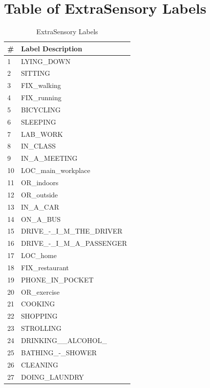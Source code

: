 \documentclass{UoNMCHA}
\numberwithin{equation}{section}
\begin{document}
\clearpage \section{Table of ExtraSensory Labels}\label{apx:ExtraSensoryLabels}
\begin{table}[h]
\begin{center}  
\caption{ExtraSensory Labels \cite{Vaizman2017}}\label{tab:ExtraSensoryLabels}
\begin{tabular}{ll}
    \hline\hline
\# & Label Description            \\ \hline 
1  & LYING\_DOWN                  \\
2  & SITTING                      \\
3  & FIX\_walking                 \\
4  & FIX\_running                 \\
5  & BICYCLING                    \\
6  & SLEEPING                     \\
7  & LAB\_WORK                    \\
8  & IN\_CLASS                    \\
9  & IN\_A\_MEETING               \\
10 & LOC\_main\_workplace         \\
11 & OR\_indoors                  \\
12 & OR\_outside                  \\
13 & IN\_A\_CAR                   \\
14 & ON\_A\_BUS                   \\
15 & DRIVE\_-\_I\_M\_THE\_DRIVER  \\
16 & DRIVE\_-\_I\_M\_A\_PASSENGER \\
17 & LOC\_home                    \\
18 & FIX\_restaurant              \\
19 & PHONE\_IN\_POCKET            \\
20 & OR\_exercise                 \\
21 & COOKING                      \\
22 & SHOPPING                     \\
23 & STROLLING                    \\
24 & DRINKING\_\_ALCOHOL\_        \\
25 & BATHING\_-\_SHOWER           \\
26 & CLEANING                     \\
27 & DOING\_LAUNDRY               \\

\end{tabular}
\end{center}
\end{table}
\end{document}
